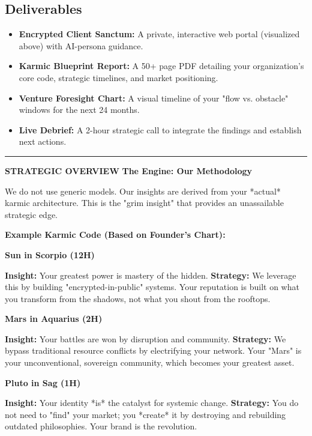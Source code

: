 \documentclass[11pt, a4paper]{article}
\newcommand{\decksection}[1]{
    \par
    \vspace{0.7cm}
    \textcolor{Emerald}{\rule{\linewidth}{1pt}}
    \vspace{0.2cm}
    \noindent\textcolor{Emerald}{\fontsize{10}{12}\selectfont\textbf{STRATEGIC OVERVIEW}}
    \noindent\fontsize{24}{28}\selectfont\textbf{#1}
    \vspace{0.5cm}
}
\newcommand{\keyinsight}[2]{
    \par
    \vspace{0.3cm}
    \noindent
    \begin{minipage}{0.15\linewidth}
        \fontsize{18}{20}\selectfont\textcolor{Emerald}{\textbf{#1}}
    \end{minipage}
    \begin{minipage}{0.8\linewidth}
        \fontsize{11}{14}\selectfont #2
    \end{minipage}
    \vspace{0.3cm}
}
\begin{document}
\subsection*{Deliverables}
\begin{itemize}
    \item \textbf{Encrypted Client Sanctum:} A private, interactive web portal (visualized above) with AI-persona guidance.
    \item \textbf{Karmic Blueprint Report:} A 50+ page PDF detailing your organization's core code, strategic timelines, and market positioning.
    \item \textbf{Venture Foresight Chart:} A visual timeline of your "flow vs. obstacle" windows for the next 24 months.
    \item \textbf{Live Debrief:} A 2-hour strategic call to integrate the findings and establish next actions.
\end{itemize}

\newpage

\decksection{The Engine: Our Methodology}
We do not use generic models. Our insights are derived from your *actual* karmic architecture. This is the "grim insight" that provides an unassailable strategic edge.

\vspace{0.5cm}
\noindent\textbf{Example Karmic Code (Based on Founder's Chart):}

\keyinsight{Sun in Scorpio (12H)}
{\textbf{Insight:} Your greatest power is mastery of the hidden. \newline
 \textbf{Strategy:} We leverage this by building "encrypted-in-public" systems. Your reputation is built on what you transform from the shadows, not what you shout from the rooftops.}

\keyinsight{Mars in Aquarius (2H)}
{\textbf{Insight:} Your battles are won by disruption and community. \newline
 \textbf{Strategy:} We bypass traditional resource conflicts by electrifying your network. Your "Mars" is your unconventional, sovereign community, which becomes your greatest asset.}

\keyinsight{Pluto in Sag (1H)}
{\textbf{Insight:} Your identity *is* the catalyst for systemic change. \newline
 \textbf{Strategy:} You do not need to "find" your market; you *create* it by destroying and rebuilding outdated philosophies. Your brand is the revolution.}
\end{document}
